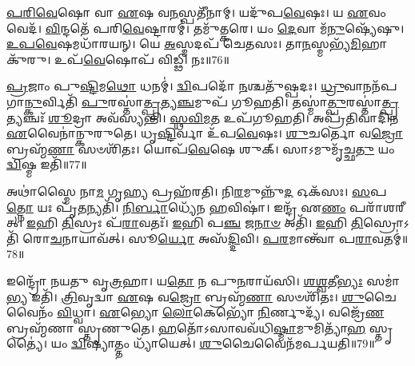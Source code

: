 \-\ul{𑌪}\-\-\ul{𑌰𑌿}\-\-\ul{𑌵𑍇}\-𑌷𑍋 𑌵𑌾 \ul{𑌏}\-𑌷 𑌵\-\ul{𑌨}\-𑌸𑍍𑌪𑌤𑍀᳴𑌨𑌾𑌮𑍍।
𑌯𑌦𑍁᳴𑌪\-\ul{𑌵𑍇}\-𑌷𑌃।
𑌯 \ul{𑌏}\-𑌵𑌂 𑌵𑍇𑌦᳴।
\-\ul{𑌵𑌿}\-𑌨𑍍𑌦𑌤𑍇᳴ 𑌪𑌰𑌿\-\ul{𑌵𑍇}\-𑌷𑍍𑌟𑌾𑌰𑌮𑍍॑।
𑌤𑌮𑍁᳴\-\ul{𑌤𑍍𑌕}\-𑌰𑍇।
𑌯𑌂 \ul{𑌦𑍇}\-𑌵𑌾 𑌮᳴\-\ul{𑌨𑍁}\-𑌷𑍍𑌯𑍇᳴𑌷𑍁।
\-\ul{𑌉}\-\-\ul{𑌪}\-\-\ul{𑌵𑍇}\-𑌷𑌮𑌧𑌾᳴𑌰𑌯𑌨𑍍।
𑌯𑍇 \ul{𑌅}\-𑌸𑍍𑌮𑌦𑌪᳴ 𑌚𑍇𑌤𑌸𑌃।
𑌤𑌾\-\ul{𑌨}\-𑌸𑍍𑌮𑌭𑍍𑌯᳴\-\ul{𑌮𑌿}\-𑌹𑌾 𑌕𑍁᳴𑌰𑍁।
𑌉𑌪᳴\-\ul{𑌵𑍇}\-𑌷𑍋𑌪᳴ 𑌵𑌿𑌡𑍍𑌢𑌿 𑌨𑌃॥76॥

\-\ul{𑌪𑍍𑌰}\-𑌜𑌾𑌂 𑌪𑍁\-\ul{𑌷𑍍𑌟𑌿}\-𑌮\-\ul{𑌥𑍋} 𑌧𑌨𑌮𑍍॑।
\-\ul{𑌦𑍍𑌵𑌿}\-𑌪𑌦𑍋᳴ \ul{𑌨}\-𑌶𑍍𑌚𑌤𑍁᳴𑌷𑍍𑌪𑌦𑌃।
\-\ul{𑌧𑍍𑌰𑍁}\-𑌵𑌾𑌨𑌨᳴𑌪\-𑌗𑌾\-\ul{𑌨𑍍𑌕𑍁}\-𑌰𑍍𑌵𑌿𑌤𑌿᳴ \ul{𑌪𑍁}\-𑌰𑌸𑍍𑌤𑌾॑\-\ul{𑌤𑍍𑌪𑍍𑌰}\-𑌤𑍍𑌯\-\ul{𑌞𑍍𑌚}\-𑌮𑍁𑌪᳴ 𑌗𑍂𑌹𑌤𑌿।
𑌤𑌸𑍍𑌮𑌾॑\-\ul{𑌤𑍍𑌪𑍁}\-𑌰\-𑌸𑍍𑌤𑌾॑\-\ul{𑌤𑍍𑌪𑍍𑌰}\-𑌤𑍍𑌯𑌞𑍍𑌚𑌃᳴ \ul{𑌶𑍂}\-𑌦𑍍𑌰𑌾 𑌅𑌵᳴𑌸𑍍𑌯𑌨𑍍𑌤𑌿।
\-\ul{𑌸𑍍𑌥}\-\-\ul{𑌵𑌿}\-\-\ul{𑌮}\-𑌤 𑌉𑌪᳴𑌗𑍂𑌹𑌤𑌿।
𑌅𑌪𑍍𑌰᳴𑌤𑌿𑌵𑌾𑌦𑌿𑌨 \ul{𑌏}\-𑌵𑍈𑌨𑌾॑𑌨𑍍𑌕𑍁𑌰𑍁𑌤𑍇।
𑌧𑍃\-\ul{𑌷𑍍𑌟𑌿}\-𑌰𑍍𑌵𑌾 𑌉᳴𑌪\-\ul{𑌵𑍇}\-𑌷𑌃।
\-\ul{𑌶𑍁}\-𑌚𑌰𑍍𑌤𑍋 𑌵\-\ul{𑌜𑍍𑌰𑍋} 𑌬𑍍𑌰𑌹𑍍𑌮᳴\-\ul{𑌣𑌾} 𑌸𑍞𑌶𑌿᳴𑌤𑌃।
𑌯𑍋𑌪᳴\-\ul{𑌵𑍇}\-𑌷𑍇 𑌶𑍁𑌕𑍍।
𑌸𑌾𑌽𑌮𑍁𑌮𑍃᳴𑌚𑍍𑌛\-\ul{𑌤𑍁} 𑌯𑌂 \ul{𑌦𑍍𑌵𑌿}\-𑌷𑍍𑌮 𑌇𑌤𑌿᳴॥77॥

𑌅𑌥𑌾॑𑌸𑍍𑌮𑍈 𑌨𑌾\-\ul{𑌮} 𑌗𑍃\-\ul{𑌹𑍍𑌯} 𑌪𑍍𑌰𑌹᳴𑌰𑌤𑌿।
𑌨𑌿\-\ul{𑌰}\-𑌮𑍁𑌨𑍍𑌨𑍁᳴\-\ul{𑌦} 𑌓𑌕᳴𑌸𑌃।
\-\ul{𑌸}\-𑌪\-\ul{𑌤𑍍𑌨𑍋} 𑌯𑌃 𑌪𑍃᳴\-\ul{𑌤}\-𑌨𑍍𑌯𑌤𑌿᳴।
\-\ul{𑌨𑌿}\-\-\ul{𑌰𑍍𑌬𑌾}\-𑌧𑍍𑌯𑍇᳴𑌨 \ul{𑌹}\-𑌵𑌿𑌷𑌾॑।
𑌇𑌨𑍍𑌦𑍍𑌰᳴ 𑌏\-\ul{𑌣𑌂} 𑌪𑌰𑌾᳴𑌶𑌰𑍀𑌤𑍍।
\-\ul{𑌇}\-𑌹𑌿 \ul{𑌤𑌿}\-𑌸𑍍𑌰𑌃 𑌪᳴\-\ul{𑌰𑌾}\-𑌵𑌤𑌃᳴।
\-\ul{𑌇}\-𑌹𑌿 𑌪\-\ul{𑌞𑍍𑌚} 𑌜\-\ul{𑌨𑌾}\-\-\ul{𑍞} 𑌅𑌤𑌿᳴।
\-\ul{𑌇}\-𑌹𑌿 \ul{𑌤𑌿}\-𑌸𑍍𑌰𑍋𑌽𑌤𑌿᳴ 𑌰𑍋\-\ul{𑌚}\-𑌨𑌾𑌯𑌾𑌵᳴𑌤𑍍।
𑌸𑍂\-\ul{𑌰𑍍𑌯𑍋} 𑌅𑌸᳴\-\ul{𑌦𑍍𑌦𑌿}\-𑌵𑌿।
\-\ul{𑌪}\-\-\ul{𑌰}\-𑌮𑌾𑌨𑍍𑌤𑍍𑌵𑌾᳴ 𑌪\-\ul{𑌰𑌾}\-𑌵𑌤𑌮𑍍॑॥78॥

𑌇𑌨𑍍𑌦𑍍𑌰𑍋᳴ 𑌨𑌯𑌤𑍁 𑌵𑍃\-\ul{𑌤𑍍𑌰}\-𑌹𑌾।
𑌯\-\ul{𑌤𑍋} 𑌨 𑌪𑍁\-\ul{𑌨}\-𑌰𑌾𑌯᳴𑌸𑌿।
\-\ul{𑌶}\-\-\ul{𑌶𑍍𑌵}\-𑌤𑍀\-\ul{𑌭𑍍𑌯𑌃} 𑌸𑌮𑌾॑\-\ul{𑌭𑍍𑌯} 𑌇𑌤𑌿᳴।
\-\ul{𑌤𑍍𑌰𑌿}\-𑌵𑍃𑌦𑍍𑌵𑌾 \ul{𑌏}\-𑌷 𑌵\-\ul{𑌜𑍍𑌰𑍋} 𑌬𑍍𑌰𑌹𑍍𑌮᳴\-\ul{𑌣𑌾} 𑌸𑍞𑌶𑌿᳴𑌤𑌃।
\-\ul{𑌶𑍁}\-𑌚𑍈𑌵𑍈𑌨𑌂᳴ \ul{𑌵𑌿}\-𑌧𑍍𑌵𑌾।
\-\ul{𑌏}\-𑌭𑍍𑌯𑍋 \ul{𑌲𑍋}\-𑌕𑍇𑌭𑍍𑌯𑍋᳴ \ul{𑌨𑌿}\-𑌰𑍍𑌣𑍁𑌦𑍍𑌯᳴।
𑌵𑌜𑍍𑌰𑍇᳴\-\ul{𑌣} 𑌬𑍍𑌰𑌹𑍍𑌮᳴𑌣𑌾 𑌸𑍍𑌤𑍃𑌣𑍁𑌤𑍇।
\-\ul{𑌹}\-𑌤𑍋᳴\-𑌽𑌸𑌾𑌵𑌵᳴𑌧𑌿\-\ul{𑌷𑍍𑌮𑌾}\-𑌮𑍁𑌮𑌿𑌤𑍍𑌯𑌾᳴\-\ul{𑌹} 𑌸𑍍𑌤𑍃𑌤𑍍𑌯𑍈॑।
𑌯𑌂 \ul{𑌦𑍍𑌵𑌿}\-𑌷𑍍𑌯𑌾𑌤𑍍𑌤𑌂 𑌧𑍍𑌯𑌾᳴𑌯𑍇𑌤𑍍।
\-\ul{𑌶𑍁}\-𑌚𑍈𑌵𑍈𑌨᳴𑌮𑌰𑍍𑌪𑌯𑌤𑌿॥79॥




